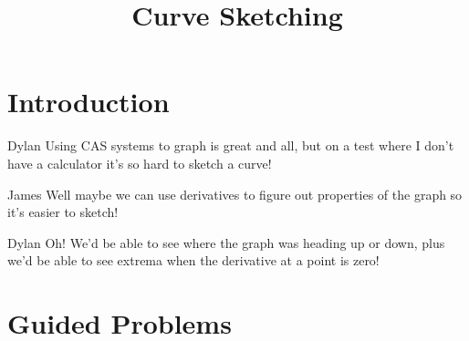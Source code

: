 \documentclass{ximera}
\title{Curve Sketching}
\begin{document}
\maketitle
\section{Introduction}
\begin{dialogue}
\item[Dylan] Using CAS systems to graph is great and all, but on a test where I don't have a calculator it's so hard to sketch a curve!
\item[James] Well maybe we can use derivatives to figure out properties of the graph so it's easier to sketch!
\item[Dylan] Oh! We'd be able to see where the graph was heading up or down, plus we'd be able to see extrema when the derivative at a point is zero!
\end{dialogue}

\section{Guided Problems}
\end{document}
